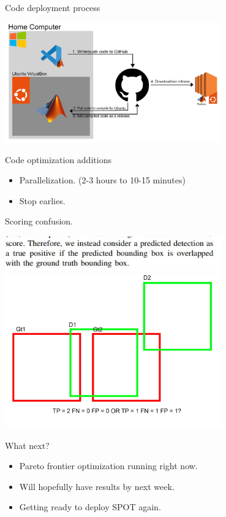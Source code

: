 \begin{frame}{Code deployment process}
    \begin{center}
        \includegraphics[height=0.7\textheight,width=0.7\textwidth,keepaspectratio]{images/baboon/Process.jpg}
    \end{center}
\end{frame}

\begin{frame}{Code optimization additions}
    \begin{itemize}
        \item Parallelization. (2-3 hours to 10-15 minutes)
        \item Stop earlies.
    \end{itemize}
\end{frame}

\begin{frame}{Scoring confusion.}
    \begin{center}
        \includegraphics[height=0.7\textheight,width=0.7\textwidth,keepaspectratio]{images/baboon/text.jpg}
        \includegraphics[height=0.7\textheight,width=0.7\textwidth,keepaspectratio]{images/baboon/gtd.jpg}
    \end{center}
\end{frame}

\begin{frame}{What next?}
    \begin{itemize}
        \item Pareto frontier optimization running right now.
        \item Will hopefully have results by next week.
        \item Getting ready to deploy SPOT again.
    \end{itemize}
\end{frame}